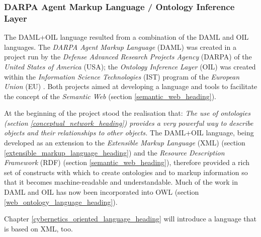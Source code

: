 %
%
%
%
%
%
%

\subsubsection{DARPA Agent Markup Language / Ontology Inference Layer}
\label{darpa_agent_markup_language_heading}

The DAML+OIL language resulted from a combination of the DAML and OIL languages.
The \emph{DARPA Agent Markup Language} (DAML) \cite{damloil} was created in a
project run by the \emph{Defense Advanced Research Projects Agency} (DARPA) of the
\emph{United States of America} (USA); the \emph{Ontology Inference Layer} (OIL)
was created within the \emph{Information Science Technologies} (IST) program of
the \emph{European Union} (EU) \cite{rdfowlrelease}. Both projects aimed at
developing a language and tools to facilitate the concept of the
\emph{Semantic Web} (section \ref{semantic_web_heading}).

At the beginning of the project stood the realisation that: \textit{The use of
ontologies (section \ref{conceptual_network_heading}) provides a very powerful
way to describe objects and their relationships to other objects.} The DAML+OIL
language, being developed as an extension to the \emph{Extensible Markup Language}
(XML) (section \ref{extensible_markup_language_heading}) and the
\emph{Resource Description Framework} (RDF) (section \ref{semantic_web_heading}),
therefore provided a \cite{rdf} rich set of constructs with which to create
ontologies and to markup information so that it becomes machine-readable and
understandable. Much of the work in DAML and OIL has now been incorporated into
OWL (section \ref{web_ontology_language_heading}).

Chapter \ref{cybernetics_oriented_language_heading} will introduce a language
that is based on XML, too.

